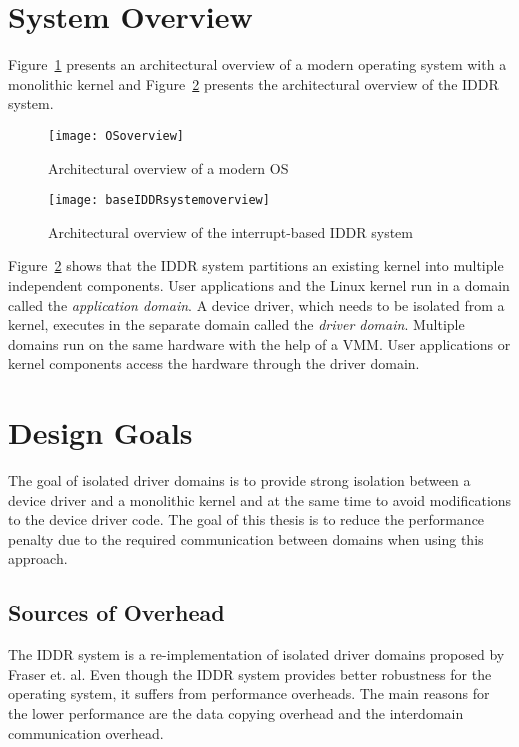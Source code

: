 \section{System Overview}\label{overview}

Figure~\ref{fig:monolithic} presents an architectural overview of a
modern operating system with a monolithic kernel and Figure~\ref{fig:base IDDR system overview} 
presents the architectural overview of the IDDR system.

\begin{figure}[!ht]
\centering
\texttt{[image: OSoverview]}
\caption{Architectural overview of a modern OS}
\label{fig:monolithic}
\end{figure}

\begin{figure}[!ht]
\centering
\texttt{[image: baseIDDRsystemoverview]}
\caption{Architectural overview of the interrupt-based IDDR system}
\label{fig:base IDDR system overview}
\end{figure}

Figure~\ref{fig:base IDDR system overview} shows that the IDDR
system partitions an existing kernel into multiple independent
components.  User applications and the Linux kernel run in a domain
called the \textit{application domain}. A device driver, which needs
to be isolated from a kernel, executes in the separate domain called
the \textit{driver domain}. Multiple domains run on the same hardware
with the help of a VMM. User applications or kernel components access
the hardware through the driver domain.

\section{Design Goals}\label{sec:designgoals}
The goal of isolated driver domains is to provide strong isolation
between a device driver and a monolithic kernel and at the same time to
avoid modifications to the device driver code. The goal of this thesis
is to reduce the performance penalty due to the required communication 
between domains when using this approach.

\subsection*{Sources of Overhead}
\label{subsec:overhead}
The IDDR system is a re-implementation of isolated driver domains proposed
by Fraser et. al. Even though the IDDR system provides better robustness
for the operating system, it suffers from performance overheads. The
main reasons for the lower performance are the data copying overhead
and the interdomain communication overhead.

